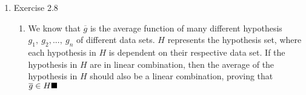 \documentclass{article}
\begin{document}
    \begin{enumerate}
        \item Exercise 2.8
        \begin{enumerate}[label=(\alph*)]
            \item We know that $\overline{g}$ is the average function of many different hypothesis $g_1,\ g_2,...,\ g_n$ of different data sets. $H$ represents the hypothesis set, where each hypothesis in $H$ is dependent on their respective data set. If the hypothesis in $H$ are in linear combination, then the average of the hypothesis in $H$ should also be a linear combination, proving that $\overline{g} \in H \hfill \blacksquare$
        \end{enumerate}
    \end{enumerate}
\end{document}
